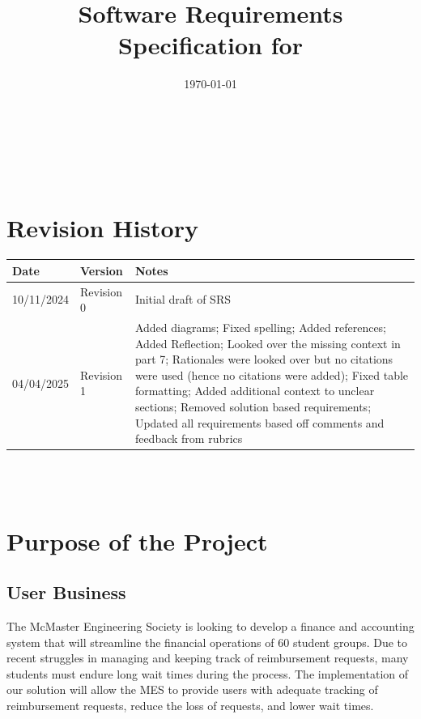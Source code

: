 \documentclass[12pt]{article}
\begin{document}
\title{Software Requirements Specification for \progname} 
\author{\authname}
\date{\today}
	
\maketitle

~\newpage


\tableofcontents

~\newpage

\section*{Revision History}

\begin{tabularx}{\textwidth}{p{3cm}p{2cm}X}
  \toprule
  \textbf{Date} & \textbf{Version} & \textbf{Notes} \\
  \midrule
  10/11/2024 & Revision 0 & Initial draft of SRS \\
  {\color{red}04/04/2025} & {\color{red}Revision 1} & {\color{red}Added diagrams; Fixed spelling; Added references; Added Reflection; Looked over the missing context in part 7; Rationales were looked over but no citations were used (hence no citations were added); Fixed table formatting; Added additional context to unclear sections; Removed solution based requirements; Updated all requirements based off comments and feedback from rubrics} \\
  \bottomrule
  \end{tabularx}

~\\

~\newpage
\section{Purpose of the Project}
\subsection{User Business}
The McMaster Engineering Society is looking to develop a finance and accounting system that will streamline the financial operations of 60 student groups. Due to recent struggles in managing and keeping track of reimbursement requests, many students must endure long wait times during the process. The implementation of our solution will allow the MES to provide users with adequate tracking of reimbursement requests, reduce the loss of requests, and lower wait times.
\end{document}
